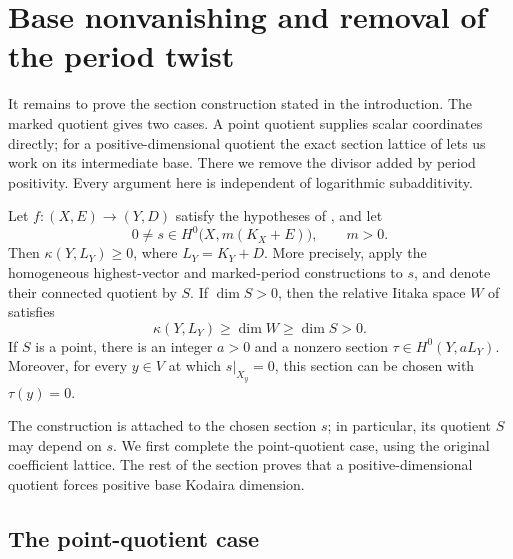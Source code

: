 \section{Base nonvanishing and removal of the period twist}
\label{sec:nonvanishing}

It remains to prove the section construction stated in the introduction.
The marked quotient gives two cases. A point quotient supplies scalar
coordinates directly; for a positive-dimensional quotient the exact
section lattice of  lets us work on its
intermediate base. There we remove the divisor added by period
positivity. Every argument here is independent of logarithmic
subadditivity.

\begin{proposition}\label{prop:nonvanishing}
Let $f:(X,E)\to(Y,D)$ satisfy the hypotheses of
, and let
\[
  0\ne s\in H^0\bigl(X,m(K_X+E)\bigr),\qquad m>0.
\]
Then $\kappa(Y,L_Y)\ge0$, where $L_Y=K_Y+D$.
More precisely, apply the homogeneous highest-vector and marked-period
constructions to $s$, and denote their connected quotient by $S$.
If $\dim S>0$, then the relative Iitaka space $W$ of
 satisfies
\[
                 \kappa(Y,L_Y)\ge\dim W\ge\dim S>0.
\]
If $S$ is a point, there is an integer $a>0$ and a nonzero section
$\tau\in H^0(Y,aL_Y)$.  Moreover, for every $y\in V$ at which
$s|_{X_y}=0$, this section can be chosen with $\tau(y)=0$.
\end{proposition}

The construction is attached to the chosen section $s$; in particular,
its quotient $S$ may depend on $s$.  We first complete the point-quotient
case, using the original coefficient lattice.  The rest of the section
proves that a positive-dimensional quotient forces positive base
Kodaira dimension.

\subsection{The point-quotient case}

